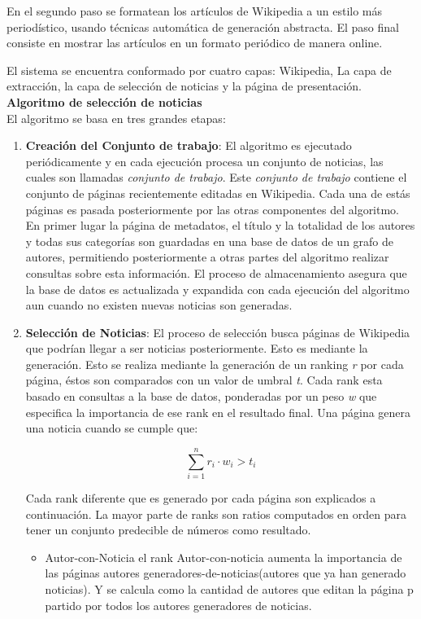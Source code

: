 En el segundo paso se formatean los artículos de Wikipedia a un estilo más periodístico, usando técnicas automática de generación abstracta. El paso final consiste en mostrar las artículos en un formato periódico de manera online.

El sistema se encuentra conformado por cuatro capas: Wikipedia, La capa de extracción, la capa de selección de noticias y la página de presentación.\\
\textbf{Algoritmo de selección de noticias} \\
El algoritmo se basa en tres grandes etapas: 

\begin{enumerate}
	\item \textbf{Creación del Conjunto de trabajo}:
	El algoritmo es ejecutado periódicamente y en cada ejecución procesa un conjunto de noticias, las cuales son llamadas \emph{conjunto de trabajo}. Este \emph{conjunto de trabajo} contiene el conjunto de páginas recientemente editadas en Wikipedia. Cada una de estás páginas es pasada posteriormente por las otras componentes del algoritmo.
	En primer lugar la página de metadatos, el título y la totalidad de los autores y todas sus categorías son guardadas en una base de datos de un grafo de autores, permitiendo posteriormente a otras partes del algoritmo realizar consultas sobre esta información.
	El proceso de almacenamiento asegura que la base de datos es actualizada y expandida con cada ejecución del algoritmo aun cuando no existen nuevas noticias son generadas.	
	\item \textbf{Selección de Noticias}:
	El proceso de selección busca páginas de Wikipedia que podrían llegar a ser noticias posteriormente. Esto es mediante la generación. Esto se realiza mediante la generación de un ranking \emph{r} por cada página, éstos son comparados con un valor de umbral \emph{t}. Cada rank esta basado en consultas a la base de datos, ponderadas por un peso \emph{w} que especifica la importancia de ese rank en el resultado final. Una página genera una noticia cuando se cumple que:
	
	\begin{equation*}
	\sum_{i=1}^{n} {r_i \cdot w_i} > t_i
	\end{equation*}  
	
	Cada rank diferente que es generado por cada página son explicados a continuación. La mayor parte de ranks son ratios computados en orden para tener un conjunto predecible de números como resultado.
	\begin{itemize}
		\item Autor-con-Noticia
		el rank Autor-con-noticia aumenta la importancia de las páginas autores generadores-de-noticias(autores que ya han generado noticias). Y se calcula como la cantidad de autores que editan la página p partido por todos los autores generadores de noticias.
		

\end{itemize}
\end{enumerate}
